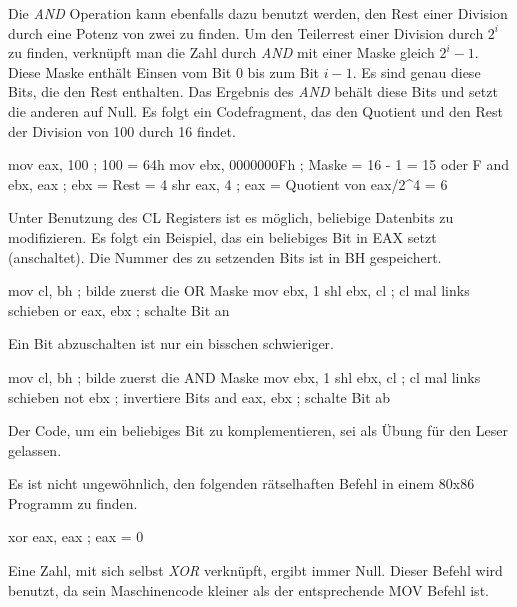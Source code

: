Die \emph{AND} Operation kann ebenfalls dazu benutzt werden, den
Rest einer Division durch eine Potenz von zwei zu finden. Um den
Teilerrest einer Division durch $2^i$ zu finden, verkn\"{u}pft man die
Zahl durch \emph{AND} mit einer Maske gleich $2^i - 1$. Diese Maske
enth\"{a}lt Einsen vom Bit 0 bis zum Bit $i-1$. Es sind genau diese
Bits, die den Rest enthalten. Das Ergebnis des \emph{AND} beh\"{a}lt
diese Bits und setzt die anderen auf Null. Es folgt ein
Codefragment, das den Quotient und den Rest der Division von 100
durch 16 findet.
\begin{AsmCodeListing}[frame=none, numbers=left, firstnumber=last, commentchar=\$]
      mov    eax, 100         ; 100 = 64h
      mov    ebx, 0000000Fh   ; Maske = 16 - 1 = 15 oder F
      and    ebx, eax         ; ebx = Rest = 4
      shr    eax, 4           ; eax = Quotient von eax/2^4 = 6
\end{AsmCodeListing}
Unter Benutzung des {\code CL} Registers ist es m\"{o}glich, beliebige
Datenbits zu modifizieren. Es folgt ein Beispiel, das ein beliebiges
Bit in {\code EAX} setzt (anschaltet). Die Nummer des zu setzenden
Bits ist in {\code BH} gespeichert.
\begin{AsmCodeListing}[frame=none, numbers=left, firstnumber=last]
      mov    cl, bh           ; bilde zuerst die OR Maske
      mov    ebx, 1
      shl    ebx, cl          ; cl mal links schieben
      or     eax, ebx         ; schalte Bit an
\end{AsmCodeListing}
Ein Bit abzuschalten ist nur ein bisschen schwieriger.
\begin{AsmCodeListing}[frame=none, numbers=left, firstnumber=last]
      mov    cl, bh           ; bilde zuerst die AND Maske
      mov    ebx, 1
      shl    ebx, cl          ; cl mal links schieben
      not    ebx              ; invertiere Bits
      and    eax, ebx         ; schalte Bit ab
\end{AsmCodeListing}
Der Code, um ein beliebiges Bit zu komplementieren, sei als \"{U}bung
f\"{u}r den Leser gelassen.

Es ist nicht ungew\"{o}hnlich, den folgenden r\"{a}tselhaften Befehl in
einem 80x86 Programm zu finden.
\begin{AsmCodeListing}[frame=none, numbers=left, firstnumber=last]
      xor    eax, eax         ; eax = 0
\end{AsmCodeListing}
Eine Zahl, mit sich selbst \emph{XOR} verkn\"{u}pft, ergibt immer Null.
Dieser Befehl wird benutzt, da sein Maschinencode kleiner als der
entsprechende {\code MOV} Befehl ist. 

